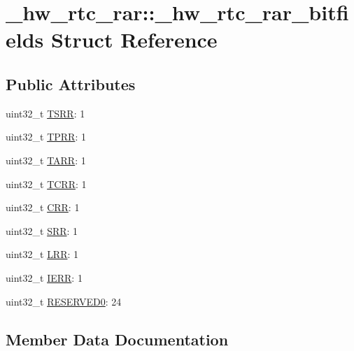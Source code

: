\hypertarget{struct__hw__rtc__rar_1_1__hw__rtc__rar__bitfields}{}\section{\+\_\+hw\+\_\+rtc\+\_\+rar\+:\+:\+\_\+hw\+\_\+rtc\+\_\+rar\+\_\+bitfields Struct Reference}
\label{struct__hw__rtc__rar_1_1__hw__rtc__rar__bitfields}
\subsection*{Public Attributes}
\begin{DoxyCompactItemize}
\item 
uint32\+\_\+t \hyperlink{struct__hw__rtc__rar_1_1__hw__rtc__rar__bitfields_a2574ea7ceef8c18615ee3ec5858c47c4}{T\+S\+RR}\+: 1
\item 
uint32\+\_\+t \hyperlink{struct__hw__rtc__rar_1_1__hw__rtc__rar__bitfields_a6e50f470158e4b98e44830025badaa34}{T\+P\+RR}\+: 1
\item 
uint32\+\_\+t \hyperlink{struct__hw__rtc__rar_1_1__hw__rtc__rar__bitfields_a8a765d1e40f827519dca0015d7250e42}{T\+A\+RR}\+: 1
\item 
uint32\+\_\+t \hyperlink{struct__hw__rtc__rar_1_1__hw__rtc__rar__bitfields_a48d32a747b4b64e8f9462e706a581386}{T\+C\+RR}\+: 1
\item 
uint32\+\_\+t \hyperlink{struct__hw__rtc__rar_1_1__hw__rtc__rar__bitfields_a09895c5cd40dfdc8747b25a88c96e958}{C\+RR}\+: 1
\item 
uint32\+\_\+t \hyperlink{struct__hw__rtc__rar_1_1__hw__rtc__rar__bitfields_a8612e423401134cacfc307dfee1c2052}{S\+RR}\+: 1
\item 
uint32\+\_\+t \hyperlink{struct__hw__rtc__rar_1_1__hw__rtc__rar__bitfields_a8caae920ccfcc83cd2fb48d9353b1341}{L\+RR}\+: 1
\item 
uint32\+\_\+t \hyperlink{struct__hw__rtc__rar_1_1__hw__rtc__rar__bitfields_a31d8768532a7cef9a2a367aed980363c}{I\+E\+RR}\+: 1
\item 
uint32\+\_\+t \hyperlink{struct__hw__rtc__rar_1_1__hw__rtc__rar__bitfields_a4639a472c267415018838b05d630d0b7}{R\+E\+S\+E\+R\+V\+E\+D0}\+: 24
\end{DoxyCompactItemize}


\subsection{Member Data Documentation}
